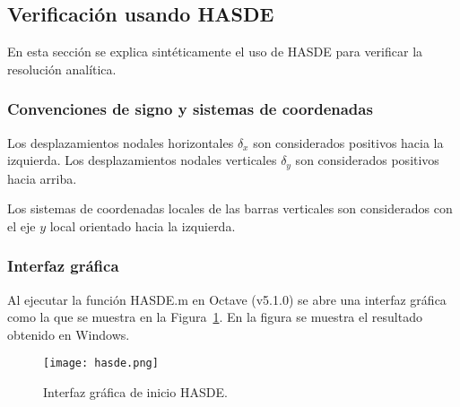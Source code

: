 %
%
%
%


\subsection{Verificación usando HASDE}

En esta sección se explica sintéticamente el uso de HASDE para verificar la resolución analítica.

\subsubsection{Convenciones de signo y sistemas de coordenadas}

Los desplazamientos nodales horizontales $\delta_x$ son considerados positivos hacia la izquierda. %
%
Los desplazamientos nodales verticales $\delta_y$ son considerados positivos hacia arriba. 

Los sistemas de coordenadas locales de las barras verticales son considerados con el eje $y$ local orientado hacia la izquierda.



\subsubsection{Interfaz gráfica}
Al ejecutar la función HASDE.m en Octave (v5.1.0) se abre una interfaz gráfica como la que se muestra en la Figura~\ref{fig:int}. En la figura se muestra el resultado obtenido en Windows.

\begin{figure}[htb]
	\begin{center}
		\texttt{[image: hasde.png]}
	\end{center}
 \caption{Interfaz gráfica de inicio HASDE.}
 \label{fig:int}
\end{figure}
 
